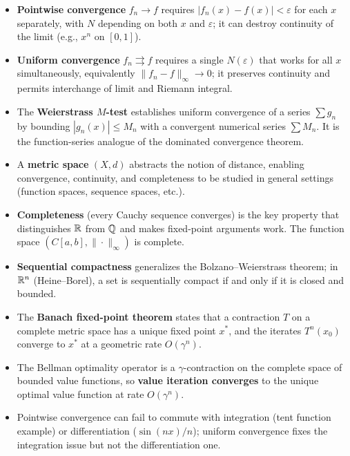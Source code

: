 \documentclass[11pt,a4paper]{article}
\begin{document}
\begin{itemize}
  \item \textbf{Pointwise convergence} $f_n \to f$ requires
    $|f_n(x) - f(x)| < \varepsilon$ for each $x$ separately, with $N$
    depending on both $x$ and $\varepsilon$; it can destroy continuity
    of the limit (e.g., $x^n$ on $[0,1]$).

  \item \textbf{Uniform convergence} $f_n \rightrightarrows f$ requires
    a single $N(\varepsilon)$ that works for all $x$ simultaneously,
    equivalently $\|f_n - f\|_\infty \to 0$; it preserves continuity
    and permits interchange of limit and Riemann integral.

  \item The \textbf{Weierstrass $M$-test} establishes uniform
    convergence of a series $\sum g_n$ by bounding $|g_n(x)| \le M_n$
    with a convergent numerical series $\sum M_n$. It is the
    function-series analogue of the dominated convergence theorem.

  \item A \textbf{metric space} $(X, d)$ abstracts the notion of
    distance, enabling convergence, continuity, and completeness to be
    studied in general settings (function spaces, sequence spaces,
    etc.).

  \item \textbf{Completeness} (every Cauchy sequence converges) is the
    key property that distinguishes $\mathbb{R}$ from $\mathbb{Q}$ and makes fixed-point
    arguments work. The function space $(C[a,b], \|\cdot\|_\infty)$ is
    complete.

  \item \textbf{Sequential compactness} generalizes the
    Bolzano--Weierstrass theorem; in $\mathbb{R}^n$ (Heine--Borel), a set is
    sequentially compact if and only if it is closed and bounded.

  \item The \textbf{Banach fixed-point theorem} states that a
    contraction $T$ on a complete metric space has a unique fixed point
    $x^*$, and the iterates $T^n(x_0)$ converge to $x^*$ at a
    geometric rate $O(\gamma^n)$.

  \item The Bellman optimality operator is a $\gamma$-contraction on
    the complete space of bounded value functions, so \textbf{value
    iteration converges} to the unique optimal value function at rate
    $O(\gamma^n)$.

  \item Pointwise convergence can fail to commute with integration
    (tent function example) or differentiation ($\sin(nx)/n$); uniform
    convergence fixes the integration issue but not the differentiation
    one.
\end{itemize}
\end{document}
